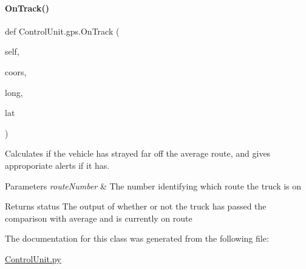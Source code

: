 \paragraph{\texorpdfstring{OnTrack()}{OnTrack()}}
{\footnotesize\ttfamily def Control\+Unit.\+gps.\+On\+Track (\begin{DoxyParamCaption}\item[{}]{self,  }\item[{}]{coors,  }\item[{}]{long,  }\item[{}]{lat }\end{DoxyParamCaption})}



Calculates if the vehicle has strayed far off the average route, and gives approporiate alerts if it has. 


\begin{DoxyParams}{Parameters}
{\em route\+Number} & The number identifying which route the truck is on \\
\hline
\end{DoxyParams}
\begin{DoxyReturn}{Returns}
status The output of whether or not the truck has passed the comparison with average and is currently on route 
\end{DoxyReturn}


The documentation for this class was generated from the following file\+:\begin{DoxyCompactItemize}
\item 
\mbox{\hyperlink{_control_unit_8py}{Control\+Unit.\+py}}\end{DoxyCompactItemize}
